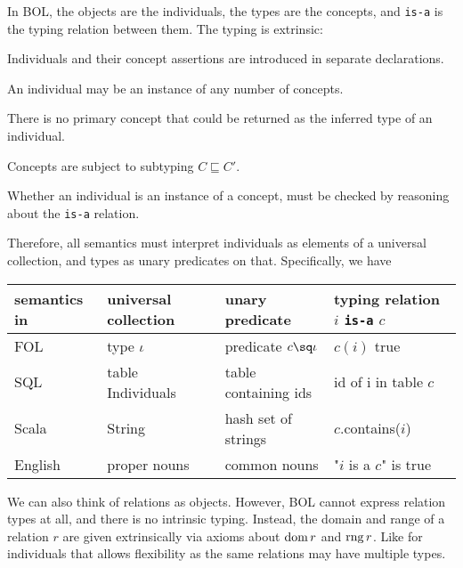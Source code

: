 \begin{example}
In BOL, the objects are the individuals, the types are the concepts, and \texttt{is-a} is the typing relation between them.
The typing is extrinsic:
\begin{compactitem}
 \item Individuals and their concept assertions are introduced in separate declarations.
 \item An individual may be an instance of any number of concepts.
 \item There is no primary concept that could be returned as the inferred type of an individual.
 \item Concepts are subject to subtyping $C\sqsubseteq C'$.
 \item Whether an individual is an instance of a concept, must be checked by reasoning about the \texttt{is-a} relation.
\end{compactitem}

Therefore, all semantics must interpret individuals as elements of a universal collection, and types as unary predicates on that.
Specifically, we have
\begin{center}
\begin{tabular}{l|lll}
semantics in  & universal collection & unary predicate & typing relation $i$ \texttt{is-a} $c$\\
\hline
FOL & type $\iota$  & predicate $c\sq\iota$ & $c(i)$ true\\
SQL & table Individuals & table containing ids & id of i in table $c$ \\
Scala & String & hash set of strings & $c$.contains($i$) \\
English & proper nouns & common nouns & "$i$ is a $c$" is true
\end{tabular}
\end{center}

We can also think of relations as objects.
However, BOL cannot express relation types at all, and there is no intrinsic typing.
Instead, the domain and range of a relation $r$ are given extrinsically via axioms about $\mathrm{dom}\,r$ and $\mathrm{rng}\,r$.
Like for individuals that allows flexibility as the same relations may have multiple types.
\end{example}

